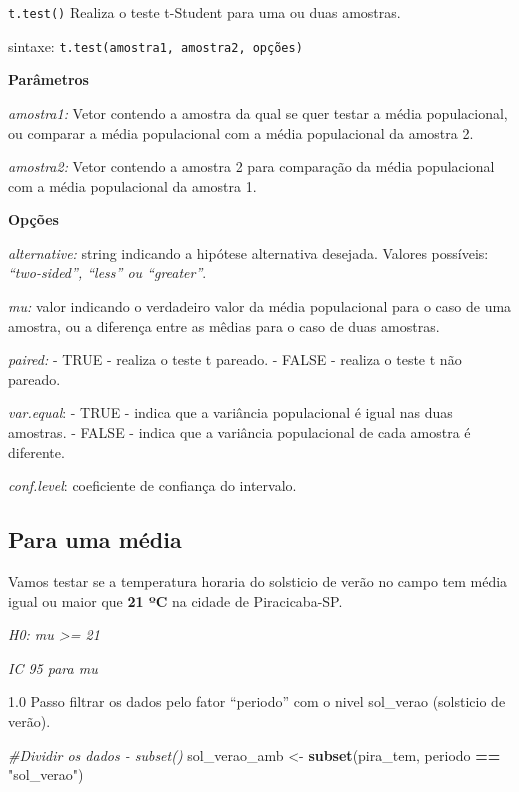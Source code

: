 \documentclass[
]{book}
\newenvironment{Shaded}{\begin{snugshade}}{\end{snugshade}}
\newcommand{\CommentTok}[1]{\textcolor[rgb]{0.56,0.35,0.01}{\textit{#1}}}
\newcommand{\KeywordTok}[1]{\textcolor[rgb]{0.13,0.29,0.53}{\textbf{#1}}}
\newcommand{\NormalTok}[1]{#1}
\newcommand{\OperatorTok}[1]{\textcolor[rgb]{0.81,0.36,0.00}{\textbf{#1}}}
\newcommand{\StringTok}[1]{\textcolor[rgb]{0.31,0.60,0.02}{#1}}
\begin{document}
\texttt{t.test()}
Realiza o teste t-Student para uma ou duas amostras.

sintaxe:
\texttt{t.test(amostra1,\ amostra2,\ opções)}

\textbf{Parâmetros}

\emph{amostra1:} Vetor contendo a amostra da qual se quer testar a média populacional, ou comparar a média populacional com a média populacional da amostra 2.

\emph{amostra2:} Vetor contendo a amostra 2 para comparação da média populacional com a média populacional da amostra 1.

\textbf{Opções}

\emph{alternative:} string indicando a hipótese alternativa desejada.
Valores possíveis: \emph{``two-sided'', ``less'' ou ``greater''}.

\emph{mu:} valor indicando o verdadeiro valor da média populacional para o caso de uma amostra, ou a diferença entre as mêdias para o caso de duas amostras.

\emph{paired:}
- TRUE - realiza o teste t pareado.
- FALSE - realiza o teste t não pareado.

\emph{var.equal}:
- TRUE - indica que a variância populacional é igual nas duas amostras.
- FALSE - indica que a variância populacional de cada amostra é diferente.

\emph{conf.level}: coeficiente de confiança do intervalo.

\hypertarget{para-uma-muxe9dia}{%
\subsection{Para uma média}\label{para-uma-muxe9dia}}

Vamos testar se a temperatura horaria do solsticio de verão no campo tem média igual ou maior que \textbf{21 ºC} na cidade de Piracicaba-SP.

\emph{H0: mu \textgreater= 21}

\emph{IC 95 para mu}

1.0 Passo filtrar os dados pelo fator ``periodo'' com o nivel sol\_verao (solsticio de verão).

\begin{Shaded}
\begin{Highlighting}[]
 \CommentTok{#Dividir os dados - subset()}
\NormalTok{    sol_verao_amb <-}\StringTok{ }\KeywordTok{subset}\NormalTok{(pira_tem, periodo }\OperatorTok{==}\StringTok{ "sol_verao"}\NormalTok{)}
\end{Highlighting}
\end{Shaded}
\end{document}
